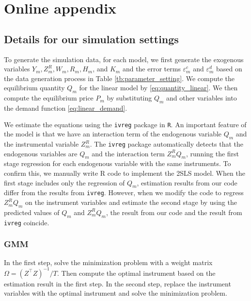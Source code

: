 \documentclass[11pt, a4paper]{article}
\begin{document}
\newpage





\newpage

\setcounter{page}{1}
\appendix
\section{Online appendix}\label{sec:appendix}




\subsection{Details for our simulation settings}

To generate the simulation data, for each model, we first generate the exogenous variables $Y_m, Z^{R}_{m}, W_m, R_{m}, H_m$, and $K_m$ and the error terms $\varepsilon_{m}^c$ and $\varepsilon_{m}^d$ based on the data generation process in Table \ref{tb:parameter_setting}.
We compute the equilibrium quantity $Q_{m}$ for the linear model by \eqref{eq:quantity_linear}.
We then compute the equilibrium price $P_m$ by substituting $Q_{m}$ and other variables into the demand function \eqref{eq:linear_demand}.

We estimate the equations using the \texttt{ivreg} package in \texttt{R}.
An important feature of the model is that we have an interaction term of the endogenous variable $Q_{m}$ and the instrumental variable $Z^{R}_{m}$.
The \texttt{ivreg} package automatically detects that the endogenous variables are $Q_{m}$ and the interaction term $Z^{R}_{m}Q_{m}$, running the first stage regression for each endogenous variable with the same instruments. To confirm this, we manually write R code to implement the 2SLS model. 
When the first stage includes only the regression of $Q_{m}$, estimation results from our code differ from the results from \texttt{ivreg}. 
However, when we modify the code to regress $Z^{R}_{m}Q_{m}$ on the instrument variables and estimate the second stage by using the predicted values of $Q_{m}$ and $Z^{R}_{m}Q_{m}$, the result from our code and the result from \texttt{ivreg} coincide.

\subsubsection{GMM}


In the first step, solve the minimization problem with a weight matrix $\Omega = (Z^\top Z)^{-1}/T$.
Then compute the optimal instrument based on the estimation result in the first step.
In the second step, replace the instrument variables with the optimal instrument and solve the minimization problem.
\end{document}
